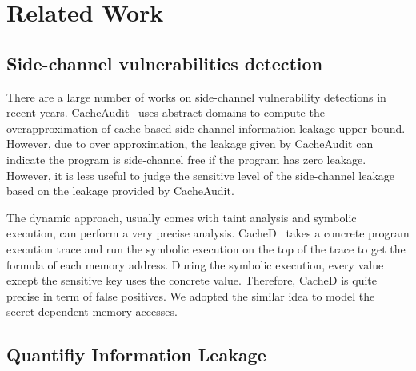 \section{Related Work}
\subsection{Side-channel vulnerabilities detection}

There are a large number of works on side-channel vulnerability detections in recent years.
CacheAudit~\cite{182946} uses abstract domains to compute the overapproximation of cache-based
side-channel information leakage upper bound. However, due to over approximation, the leakage
given by CacheAudit can indicate the program is side-channel free if the program has zero leakage. 
However, it is less useful to judge the sensitive level of the side-channel leakage based on the
leakage provided by CacheAudit. 

The dynamic approach, usually comes with taint analysis and symbolic execution, can perform a very 
precise analysis. CacheD~\cite{203878} takes a concrete program execution trace and run the symbolic
execution on the top of the trace to get the formula of each memory address. During the symbolic
execution, every value except the sensitive key uses the concrete value. Therefore, CacheD is quite 
precise in term of false positives. We adopted the similar idea to model the  secret-dependent memory 
accesses.  
\subsection{Quantifiy Information Leakage}